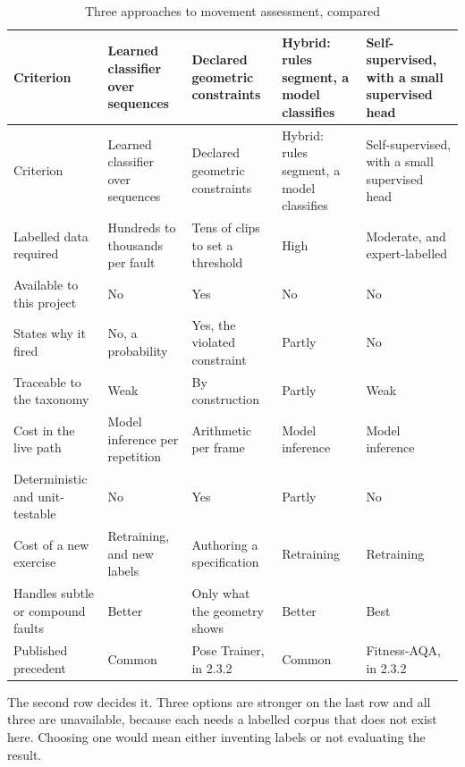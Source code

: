 {\footnotesize
\setlength{\LTpre}{6pt}\setlength{\LTpost}{8pt}
\begin{longtable}{>{\raggedright\arraybackslash}p{}>{\raggedright\arraybackslash}p{}>{\raggedright\arraybackslash}p{}>{\raggedright\arraybackslash}p{}>{\raggedright\arraybackslash}p{}}
\caption{Three approaches to movement assessment, compared}\\
\toprule
Criterion & Learned classifier over sequences & Declared geometric constraints & Hybrid: rules segment, a model classifies & Self-supervised, with a small supervised head \\
\midrule
\endfirsthead
\toprule
Criterion & Learned classifier over sequences & Declared geometric constraints & Hybrid: rules segment, a model classifies & Self-supervised, with a small supervised head \\
\midrule
\endhead
\bottomrule
\endfoot
\bottomrule
\endlastfoot
Labelled data required & Hundreds to thousands per fault & Tens of clips to set a threshold & High & Moderate, and expert-labelled \\
Available to this project & No & Yes & No & No \\
States why it fired & No, a probability & Yes, the violated constraint & Partly & No \\
Traceable to the taxonomy & Weak & By construction & Partly & Weak \\
Cost in the live path & Model inference per repetition & Arithmetic per frame & Model inference & Model inference \\
Deterministic and unit-testable & No & Yes & Partly & No \\
Cost of a new exercise & Retraining, and new labels & Authoring a specification & Retraining & Retraining \\
Handles subtle or compound faults & Better & Only what the geometry shows & Better & Best \\
Published precedent & Common & Pose Trainer, in 2.3.2 & Common & Fitness-AQA, in 2.3.2 \\
\end{longtable}
}

The second row decides it. Three options are stronger on the last row and all three are unavailable, because each needs a labelled corpus that does not exist here. Choosing one would mean either inventing labels or not evaluating the result.

